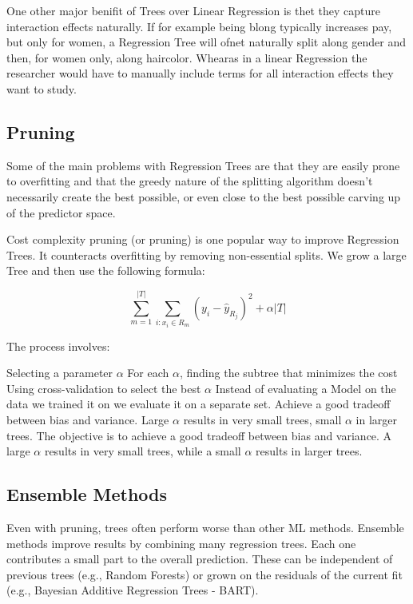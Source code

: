 \documentclass[12pt]{article}
\begin{document}
One other major benifit of Trees over Linear Regression is thet they capture interaction effects naturally. If for example being blong typically increases pay, but only for women, a Regression Tree will ofnet naturally split along gender and then, for women only, along haircolor. Whearas in a linear Regression the researcher would have to manually include terms for all interaction effects they want to study.

\subsection{Pruning}

Some of the main problems with Regression Trees are that they are easily prone to overfitting and that the greedy nature of the splitting algorithm doesn't necessarily create the best possible, or even close to the best possible carving up of the predictor space.

Cost complexity pruning (or pruning) is one popular way to improve Regression Trees. It counteracts overfitting by removing non-essential splits. We grow a large Tree and then use the following formula:

\begin{equation}
    \sum_{m=1}^{|T|} \sum_{i: x_i \in R_m} (y_i - \hat{y}_{R_j})^2 + \alpha|T|
\end{equation}

The process involves:

Selecting a parameter $\alpha$
For each $\alpha$, finding the subtree that minimizes the cost
Using cross-validation to select the best $\alpha$
Instead of evaluating a Model on the data we trained it on we evaluate it on a separate set.
Achieve a good tradeoff between bias and variance.
Large \( \alpha \) results in very small trees, small \( \alpha \) in larger trees.
The objective is to achieve a good tradeoff between bias and variance. A large $\alpha$ results in very small trees, while a small $\alpha$ results in larger trees.


\subsection{Ensemble Methods}
Even with pruning, trees often perform worse than other ML methods. Ensemble methods improve results by combining many regression trees. Each one contributes a small part to the overall prediction. These can be independent of previous trees (e.g., Random Forests) or grown on the residuals of the current fit (e.g., Bayesian Additive Regression Trees - BART).
\end{document}
